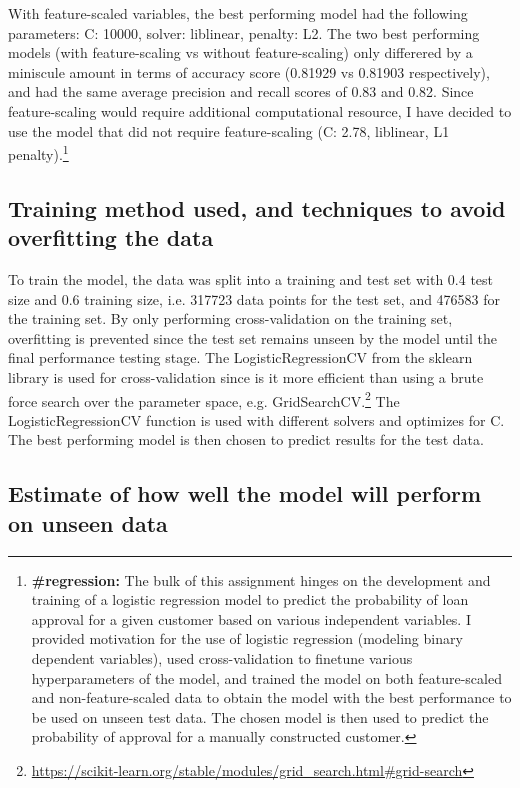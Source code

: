 \documentclass[11pt]{article}
\begin{document}
With feature-scaled variables, the best performing model had the
following parameters: C: 10000, solver: liblinear, penalty: L2. The two
best performing models (with feature-scaling vs without feature-scaling)
only differered by a miniscule amount in terms of accuracy score
(0.81929 vs 0.81903 respectively), and had the same average precision
and recall scores of 0.83 and 0.82. Since feature-scaling would require
additional computational resource, I have decided to use the model that
did not require feature-scaling (C: 2.78, liblinear, L1 penalty).\footnote{\textbf{\#regression: }The bulk of this assignment hinges on the development and training of a logistic regression model to predict the probability of loan approval for a given customer based on various independent variables. I provided motivation for the use of logistic regression (modeling binary dependent variables), used cross-validation to finetune various hyperparameters of the model, and trained the model on both feature-scaled and non-feature-scaled data to obtain the model with the best performance to be used on unseen test data. The chosen model is then used to predict the probability of approval for a manually constructed customer.}

    \subsection{Training method used, and techniques to avoid overfitting the data}

To train the model, the data was split into a training and test set with
0.4 test size and 0.6 training size, i.e. 317723 data points for the
test set, and 476583 for the training set. By only performing
cross-validation on the training set, overfitting is prevented since the
test set remains unseen by the model until the final performance testing
stage. The LogisticRegressionCV from the sklearn library is used for
cross-validation since is it more efficient than using a brute force
search over the parameter space, e.g. GridSearchCV.\footnote{\url{
https://scikit-learn.org/stable/modules/grid\_search.html\#grid-search}}
The LogisticRegressionCV function is used with different solvers and
optimizes for C. The best performing model is then chosen to predict
results for the test data.

    \subsection{Estimate of how well the model will perform on unseen data}
\end{document}
